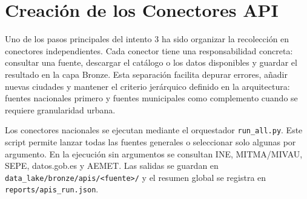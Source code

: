 \section{Creación de los Conectores API}

Uno de los pasos principales del intento 3 ha sido organizar la recolección en conectores independientes. Cada conector tiene una responsabilidad concreta: consultar una fuente, descargar el catálogo o los datos disponibles y guardar el resultado en la capa Bronze. Esta separación facilita depurar errores, añadir nuevas ciudades y mantener el criterio jerárquico definido en la arquitectura: fuentes nacionales primero y fuentes municipales como complemento cuando se requiere granularidad urbana.

Los conectores nacionales se ejecutan mediante el orquestador \texttt{run\_all.py}. Este script permite lanzar todas las fuentes generales o seleccionar solo algunas por argumento. En la ejecución sin argumentos se consultan INE, MITMA/MIVAU, SEPE, datos.gob.es y AEMET. Las salidas se guardan en \texttt{data\_lake/bronze/apis/<fuente>/} y el resumen global se registra en \texttt{reports/apis\_run.json}.

